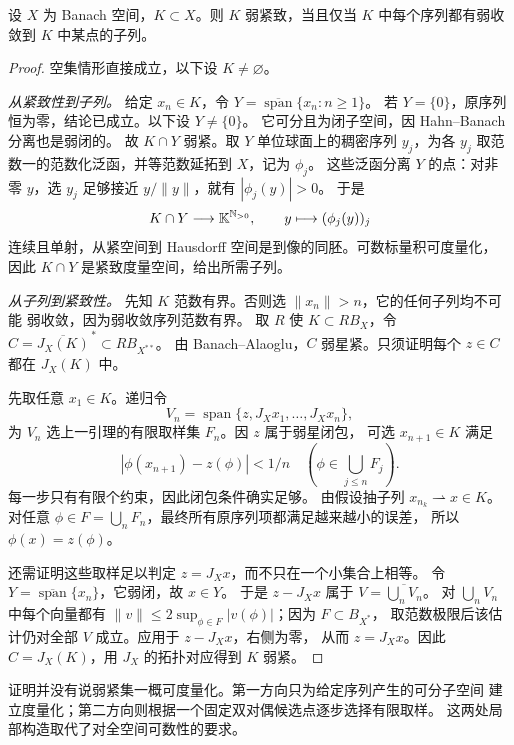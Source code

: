 \begin{theorem}\label{thm:eberlein-smulian}
设 \(X\) 为 Banach 空间，\(K\subset X\)。则 \(K\) 弱紧致，当且仅当
\(K\) 中每个序列都有弱收敛到 \(K\) 中某点的子列。
\end{theorem}
\begin{proof}
空集情形直接成立，以下设 \(K\ne\varnothing\)。

\emph{从紧致性到子列。}
给定 \(x_n\in K\)，令 \(Y=\overline{\operatorname{span}}\{x_n:n\ge1\}\)。
若 \(Y=\{0\}\)，原序列恒为零，结论已成立。以下设 \(Y\ne\{0\}\)。
它可分且为闭子空间，因 Hahn--Banach 分离也是弱闭的。
故 \(K\cap Y\) 弱紧。取 \(Y\) 单位球面上的稠密序列 \(y_j\)，为各 \(y_j\)
取范数一的范数化泛函，并等范数延拓到 \(X\)，记为 \(\phi_j\)。
这些泛函分离 \(Y\) 的点：对非零 \(y\)，选 \(y_j\) 足够接近
\(y/\|y\|\)，就有 \(|\phi_j(y)|>0\)。
于是
\[
 K\cap Y\longrightarrow\mathbb K^{\mathbb{N}_{>0}},\qquad
 y\longmapsto(\phi_j(y))_j
\]
连续且单射，从紧空间到 Hausdorff 空间是到像的同胚。可数标量积可度量化，
因此 \(K\cap Y\) 是紧致度量空间，给出所需子列。

\emph{从子列到紧致性。}
先知 \(K\) 范数有界。否则选 \(\|x_n\|>n\)，它的任何子列均不可能
弱收敛，因为弱收敛序列范数有界。
取 \(R\) 使 \(K\subset RB_X\)，令
\(C=\overline{J_X(K)}^{\,*}\subset RB_{X^{**}}\)。
由 Banach--Alaoglu，\(C\) 弱星紧。只须证明每个 \(z\in C\) 都在 \(J_X(K)\) 中。

先取任意 \(x_1\in K\)。递归令
\[
 V_n=\operatorname{span}\{z,J_Xx_1,\ldots,J_Xx_n\},
\]
为 \(V_n\) 选上一引理的有限取样集 \(F_n\)。因 \(z\) 属于弱星闭包，
可选 \(x_{n+1}\in K\) 满足
\[
 |\phi(x_{n+1})-z(\phi)|<1/n
 \quad\left(\phi\in\bigcup_{j\le n}F_j\right).
\]
每一步只有有限个约束，因此闭包条件确实足够。
由假设抽子列 \(x_{n_k}\rightharpoonup x\in K\)。对任意
\(\phi\in F=\bigcup_nF_n\)，最终所有原序列项都满足越来越小的误差，
所以 \(\phi(x)=z(\phi)\)。

还需证明这些取样足以判定 \(z=J_Xx\)，而不只在一个小集合上相等。
令 \(Y=\overline{\operatorname{span}}\{x_n\}\)，它弱闭，故 \(x\in Y\)。
于是 \(z-J_Xx\) 属于 \(V=\overline{\bigcup_nV_n}\)。
对 \(\bigcup_nV_n\) 中每个向量都有
\(\|v\|\le2\sup_{\phi\in F}|v(\phi)|\)；因为 \(F\subset B_{X^*}\)，
取范数极限后该估计仍对全部 \(V\) 成立。应用于 \(z-J_Xx\)，右侧为零，
从而 \(z=J_Xx\)。因此 \(C=J_X(K)\)，用 \(J_X\) 的拓扑对应得到 \(K\) 弱紧。
\end{proof}

证明并没有说弱紧集一概可度量化。第一方向只为给定序列产生的可分子空间
建立度量化；第二方向则根据一个固定双对偶候选点逐步选择有限取样。
这两处局部构造取代了对全空间可数性的要求。

